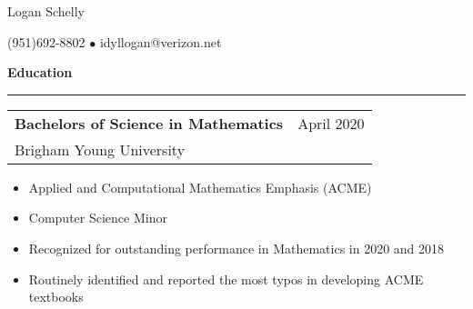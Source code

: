 \documentclass{article}
\newcommand{\jobInfo}[4]{
  \begingroup
  \setlength{\tabcolsep}{0ex}
  \begin{tabularx}{\linewidth}{X r}
    #1 & %
    #2\\ %
    #3 & %
    #4   %
  \end{tabularx}%
  \endgroup%
}
\newcommand{\degree}[4]{
  \jobInfo{\textbf{#1}}{#2}{#3}{#4}
}
\begin{document}
\begin{center}
{\Large Logan Schelly} %

(951)\phantom{-}692-8802 %
$\bullet$ %
idyllogan@verizon.net %
\end{center}
\begin{comment}
\textbf{Objective}
\smallskip
\hrule
I am a recent graduate.
My ultimate career goal would be to work on a project like Intel's Math Kernel Library.
For the time being I am looking for an entry-level job in software, data, or (if possible) high performance computing.
\end{comment}
\textbf{Education}
\smallskip
\hrule

\degree{Bachelors of Science in Mathematics}{April 2020}{Brigham Young University}{}%
%
\begin{itemize}[labelindent=2ex, itemsep=0ex, parsep=0ex, partopsep=0ex, topsep= -.7ex]%
  \item Applied and Computational Mathematics Emphasis (ACME)
  \item Computer Science Minor
  \item Recognized for outstanding performance in Mathematics in 2020 and 2018
  \item Routinely identified and reported the most typos in developing ACME textbooks
\end{itemize}
\end{document}
